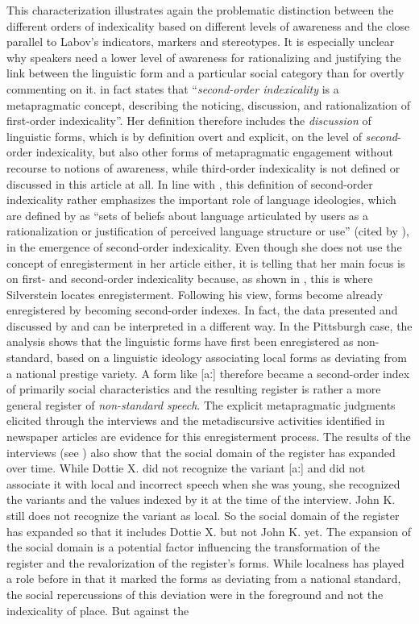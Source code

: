 This characterization illustrates again the problematic distinction between the different orders of indexicality based on different levels of awareness and the close parallel to Labov’s indicators, markers and stereotypes. It is especially unclear why speakers need a lower level of awareness for rationalizing and justifying the link between the linguistic form and a particular social category than for overtly commenting on it. \citet[167]{Milroy2004} in fact states that “\emph{second-order indexicality} is a metapragmatic concept, describing the noticing, discussion, and rationalization of first-order indexicality”. Her definition therefore includes the \textit{discussion} of linguistic forms, which is by definition overt and explicit, on the level of \emph{second}{}-order indexicality, but also other forms of metapragmatic engagement without recourse to notions of awareness, while third-order indexicality is not defined or discussed in this article at all. In line with \citet{Silverstein2003}, this definition of second-order indexicality rather emphasizes the important role of language ideologies, which are defined by \citet[193]{Silverstein1979} as “sets of beliefs about language articulated by users as a rationalization or justification of perceived language structure or use” (cited by \citealt[166]{Milroy2004}), in the emergence of second-order indexicality. Even though she does not use the concept of enregisterment in her article either, it is telling that her main focus is on first- and second-order indexicality because, as shown in , this is where Silverstein locates enregisterment. Following his view, forms become already enregistered by becoming second-order indexes. In fact, the data presented and discussed by \citet{Johnstone2006} and \citet{Beal2009, Beal2012} can be interpreted in a different way. In the Pittsburgh case, the analysis shows that the linguistic forms have first been enregistered as non-standard, based on a linguistic ideology associating local forms as deviating from a national prestige variety. A form like [aː] therefore became a second-order index of primarily social characteristics and the resulting register is rather a more general register of \textit{non-standard speech}. The explicit metapragmatic judgments elicited through the interviews and the metadiscursive activities identified in newspaper articles are evidence for this enregisterment process. The results of the interviews (see ) also show that the social domain of the register has expanded over time. While Dottie X. did not recognize the variant [aː] and did not associate it with local and incorrect speech when she was young, she recognized the variants and the values indexed by it at the time of the interview. John K. still does not recognize the variant as local. So the social domain of the register has expanded so that it includes Dottie X. but not John K. yet. The expansion of the social domain is a potential factor influencing the transformation of the register and the revalorization of the register’s forms. While localness has played a role before in that it marked the forms as deviating from a national standard, the social repercussions of this deviation were in the foreground and not the indexicality of place. But against the 